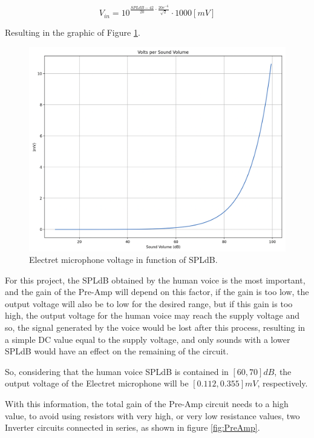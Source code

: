 \begin{equation}
    V_{in} = 10^{\frac{SPLdB-42}{20} \cdot \frac{20e^{-6}}{\sqrt{2}} } \cdot 1000 [mV]
    \label{eq:VoltageSPLdB}
\end{equation}

Resulting in the graphic of Figure \ref{fig:GraphSPLdB}.

\begin{figure}[H]
    \centering
    \includegraphics*[scale = 0.4]{Images/GraphSPLdB.png}
    \caption{Electret microphone voltage in function of SPLdB.}
    \label{fig:GraphSPLdB}
\end{figure}

For this project, the SPLdB obtained by the human voice is the most important, and the gain of the Pre-Amp will depend on this factor, if the gain is too low, the output voltage will also be to low for the desired range, but if this gain is too high, the output voltage for the human voice may reach the supply voltage and so, the signal generated by the voice would be lost after this process, resulting in a simple DC value equal to the supply voltage, and only sounds with a lower SPLdB would have an effect on the remaining of the circuit.

So, considering that the human voice SPLdB is contained in $[60, 70]dB$, the output voltage of the Electret microphone will be $[0.112, 0.355]mV$, respectively.

With this information, the total gain of the Pre-Amp circuit needs to a high value, to avoid using resistors with very high, or very low resistance values, two Inverter circuits connected in series, as shown in figure \ref{fig:PreAmp}.

